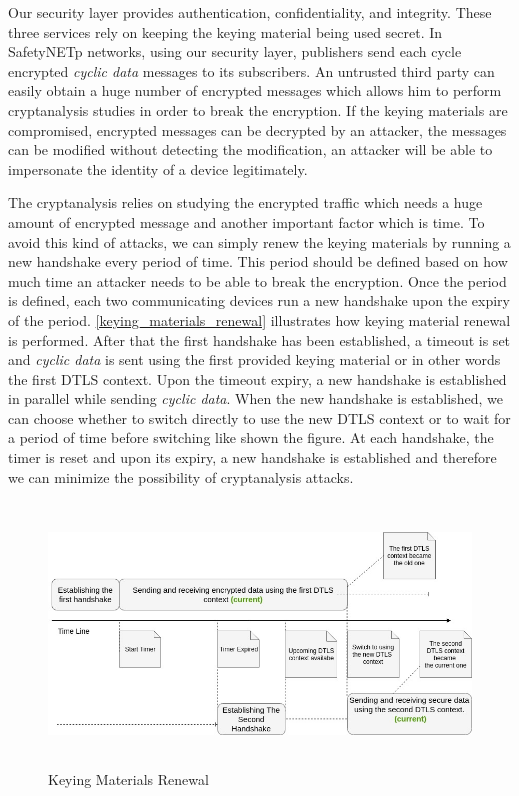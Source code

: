 Our security layer provides authentication, confidentiality, and integrity. These three services rely on keeping the keying
material being used secret. In SafetyNETp networks, using our security layer, publishers send each cycle
encrypted \textit{cyclic data} messages to its subscribers. An untrusted third party can easily obtain a huge number of
encrypted messages which allows him to perform cryptanalysis studies in order to break the encryption.
If the keying materials are compromised, encrypted messages can be decrypted by an attacker, the messages
can be modified without detecting the modification, an attacker will be able to impersonate
the identity of a device legitimately.

The cryptanalysis relies on studying the encrypted traffic which needs a huge amount of encrypted message
and another important factor which is time. To avoid this kind of attacks, we can simply renew
the keying materials by running a new handshake every period of time.
This period should be defined based on how much time an attacker needs to be able to break the encryption.
Once the period is defined, each two communicating devices run a new handshake upon the expiry of the period.
\autoref{keying_materials_renewal} illustrates how keying material renewal is performed. After that the first handshake has been
established, a timeout is set and \textit{cyclic data} is sent using the first provided keying material or in other words the first DTLS context.
Upon the timeout expiry, a new handshake is established in parallel while sending \textit{cyclic data}.
When the new handshake is established, we can choose whether to switch directly to use the new DTLS context
or to wait for a period of time before switching like shown the figure. At each handshake, the timer is reset
and upon its expiry, a new handshake is established and therefore we can minimize the possibility of cryptanalysis attacks.

\begin{figure}[H]
\centering
\includegraphics[height=7cm]{figures/design/keying_materials_renewal.jpg}
\caption{Keying Materials Renewal}\label{keying_materials_renewal}
\end{figure}

